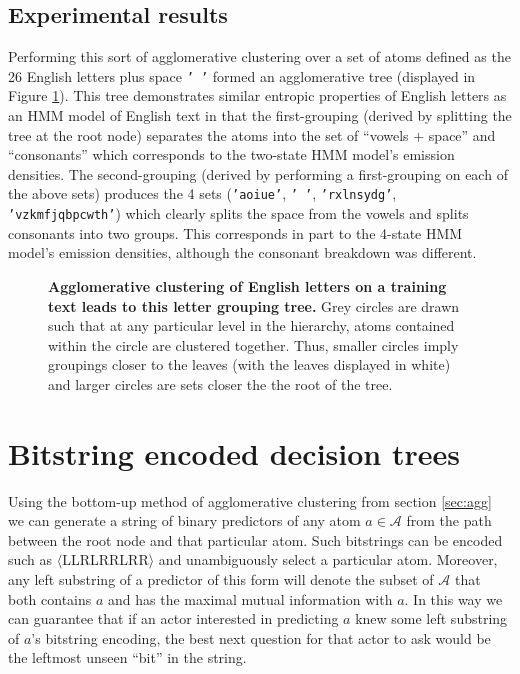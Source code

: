 \documentclass[12pt]{article}
\begin{document}
\subsection{Experimental results}

Performing this sort of agglomerative clustering over a set of atoms
defined as the 26 English letters plus space \texttt{' '} formed an
agglomerative tree (displayed in Figure
\ref{fig:agglomerative-bubbles}). This tree demonstrates similar
entropic properties of English letters as an HMM model of English text
in that the first-grouping (derived by splitting the tree at the root
node) separates the atoms into the set of ``vowels $+$ space'' and
``consonants'' which corresponds to the two-state HMM model's emission
densities. The second-grouping (derived by performing a first-grouping
on each of the above sets) produces the 4 sets (\texttt{'aoiue'},
\texttt{' '}, \texttt{'rxlnsydg'}, \texttt{'vzkmfjqbpcwth'}) which
clearly splits the space from the vowels and splits consonants into
two groups. This corresponds in part to the 4-state HMM model's
emission densities, although the consonant breakdown was different.

\begin{figure}
  \centering
  \caption{\textbf{Agglomerative clustering of English letters on a
      training text leads to this letter grouping tree.} Grey circles
    are drawn such that at any particular level in the hierarchy,
    atoms contained within the circle are clustered together. Thus,
    smaller circles imply groupings closer to the leaves (with the
    leaves displayed in white) and larger circles are sets closer the
    the root of the tree.}
\label{fig:agglomerative-bubbles}
\end{figure}

\section{Bitstring encoded decision trees}

Using the bottom-up method of agglomerative clustering from section
\ref{sec:agg} we can generate a string of binary predictors of any
atom $a \in \mathcal{A}$ from the path between the root node and that
particular atom. Such bitstrings can be encoded such as
$\langle$LLRLRRLRR$\rangle$ and unambiguously select a particular
atom. Moreover, any left substring of a predictor of this form will
denote the subset of $\mathcal{A}$ that both contains $a$ and has the
maximal mutual information with $a$. In this way we can guarantee
that if an actor interested in predicting $a$ knew some left substring
of $a$'s bitstring encoding, the best next question for that actor to
ask would be the leftmost unseen ``bit'' in the string.
\end{document}

